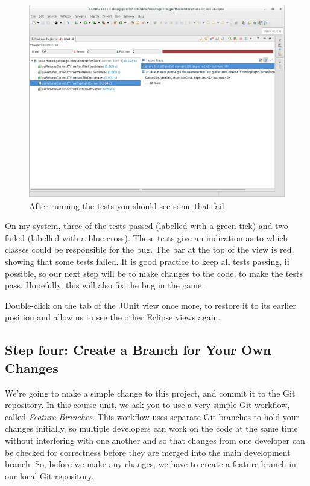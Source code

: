 \documentclass[
]{book}
\begin{document}
\begin{figure}

{\centering \includegraphics[width=1\linewidth]{images/runTheTestsAndSeeSomeFail} 

}

\caption{After running the tests you should see some that fail}\label{fig:runTheTestsAndSeeSomeFail-fig}
\end{figure}

On my system, three of the tests passed (labelled with a green tick) and two failed (labelled with a blue cross). These tests give an indication as to which classes could be responsible for the bug. The bar at the top of the view is red, showing that some tests failed. It is good practice to keep all tests passing, if possible, so our next step will be to make changes to the code, to make the tests pass. Hopefully, this will also fix the bug in the game.

Double-click on the tab of the JUnit view once more, to restore it to its earlier position and allow us to see the other Eclipse views again.

\hypertarget{createbranch}{%
\subsection{Step four: Create a Branch for Your Own Changes}\label{createbranch}}

We're going to make a simple change to this project, and commit it to the Git repository. In this course unit, we ask you to use a very simple Git workflow, called \emph{Feature Branches}. This workflow uses separate Git branches to hold your changes initially, so multiple developers can work on the code at the same time without interfering with one another and so that changes from one developer can be checked for correctness before they are merged into the main development branch. So, before we make any changes, we have to create a feature branch in our local Git repository.
\end{document}
